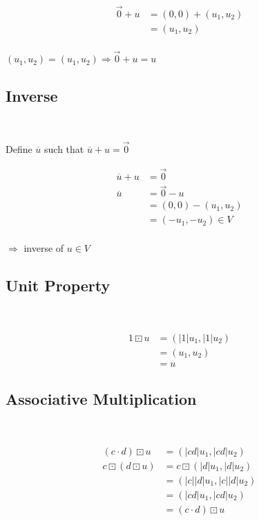 \documentclass{article}
\begin{document}
~

\begin{equation}
\tag{2.4-1}
\begin{split}
\overrightarrow{0} +u&=(0,0)+(u_1,u_2)\\
&=(u_1,u_2)\\
\end{split}
\end{equation}

$(u_1,u_2)=(u_1,u_2)\Rightarrow \overrightarrow{0}+u=u$

\subsection{Inverse}

~

Define $\overline{u}$ such that $\overline{u} +u=\overrightarrow{0}$

\begin{equation}
\tag{2.5-1}
\begin{split}
\overline{u}+u&=\overrightarrow{0}\\
\overline{u}&=\overrightarrow{0}-u\\
&=(0,0)-(u_1,u_2)\\
&=(-u_1,-u_2) \in V\\
\end{split}
\end{equation}

$\Rightarrow$ inverse of $u \in V$

\subsection{Unit Property}

~

\begin{equation}
\tag{2.6-1}
\begin{split}
1 \boxdot u &= (\lvert 1\rvert u_1,\lvert 1\rvert u_2) \\
&=(u_1,u_2)\\
&=u
\end{split}
\end{equation}

\subsection{Associative Multiplication}

~

\begin{equation}
\tag{2.7-1}
\begin{split}
(c \cdot d) \boxdot u &= (\lvert cd \rvert u_1,\lvert cd\rvert u_2)\\
c \boxdot (d \boxdot u) &= c\boxdot (\lvert d\rvert u_1,\lvert d\rvert u_2)\\
&= (\lvert c\rvert \lvert d\rvert u_1, \lvert c\rvert \lvert d \rvert u_2)\\
&= (\lvert cd \rvert u_1,\lvert cd\rvert u_2)\\
&= (c \cdot d) \boxdot u\\
\end{split}
\end{equation}
\end{document}
